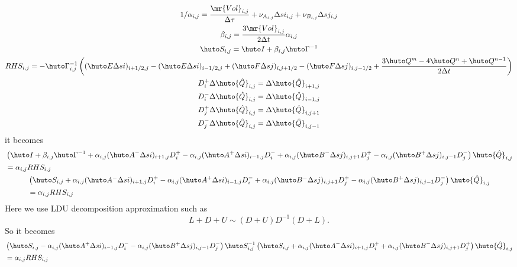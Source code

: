 \documentclass{jsarticle}
\newcommand{\bQ}{\huto Q}
\newcommand{\bhQ}{\huto{\hat Q}}
\newcommand{\bI}{\huto I}
\newcommand{\bE}{\huto E}
\newcommand{\bF}{\huto F}
\newcommand{\bA}{\huto A}
\newcommand{\bB}{\huto B}
\newcommand{\bS}{\huto S}
\newcommand{\bG}{\huto \Gamma}
\newcommand{\Vol}{\mr{Vol}}
\begin{document}
\begin{gather}
1/\alpha _{i,j}=\frac{\Vol _{i,j}}{\Delta \tau} + \nu _{A_{i,j}}\Delta si_{i,j} + \nu _{B_{i,j  }}\Delta sj_{i,j  }\\
\beta _{i,j} = \frac{3\Vol _{i,j}}{2\Delta t}\alpha_{i,j}\\
\bS_{i,j} = \bI +\beta _ {i,j}\bG ^{-1}\\
RHS_{i,j} = -\bG ^{-1} _{i,j} \left( (\bE \Delta si)_{i+1/2,j} - (\bE \Delta si)_{i-1/2,j}+  (\bF \Delta sj)_{i,j+1/2} - (\bF \Delta sj)_{i,j-1/2}+\frac{3\bQ^m-4\bQ^n+\bQ^{n-1}}{2\Delta t}\right) \\
D_i^+ \Delta \bhQ_{i,j} = \Delta \bhQ_{i+1,j}\\
D_i^- \Delta \bhQ_{i,j} = \Delta \bhQ_{i-1,j}\\
D_j^+ \Delta \bhQ_{i,j} = \Delta \bhQ_{i,j+1}\\
D_j^- \Delta \bhQ_{i,j} = \Delta \bhQ_{i,j-1}
\end{gather}
it becomes
\begin{gather}
\begin{split}
&\left( \bI +\beta _ {i,j}\bG ^{-1}+ \alpha_{i,j}(\bA^-\Delta si)_{i+1,j}D_i^+ - \alpha_{i,j}(\bA^+\Delta si)_{i-1,j}D_i^-+ \alpha_{i,j}(\bB^-\Delta sj)_{i,j+1}D_j^+ - \alpha_{i,j}(\bB^+\Delta sj)_{i,j-1}D_j^- \right) \bhQ _{i,j}\\
&=\alpha_{i,j}RHS_{i,j}
\end{split}\\
\begin{split}
&\left( \bS_ {i,j}+ \alpha_{i,j}(\bA^-\Delta si)_{i+1,j}D_i^+ - \alpha_{i,j}(\bA^+\Delta si)_{i-1,j}D_i^-+ \alpha_{i,j}(\bB^-\Delta sj)_{i,j+1}D_j^+ - \alpha_{i,j}(\bB^+\Delta sj)_{i,j-1}D_j^- \right) \bhQ _{i,j}\\
&=\alpha_{i,j}RHS_{i,j}
\end{split}
\end{gather}
Here we use LDU decomposition approximation such as
\begin{equation}
L+D+U \sim (D+U)D^{-1}(D+L).
\end{equation}
So it becomes
\begin{gather}
\begin{split}
&\left( \bS_{i,j} -\alpha_{i,j}(\bA^+\Delta si)_{i-1,j}D_i^- -\alpha_{i,j}(\bB^+\Delta sj)_{i,j-1}D_j^-\right)\bS_{i,j}^{-1}\left( \bS_{i,j} +\alpha_{i,j}(\bA^-\Delta si)_{i+1,j}D_i^+ +\alpha_{i,j} (\bB^-\Delta sj)_{i,j+1}D_j^+\right) \bhQ _{i,j}\\
&=\alpha_{i,j}RHS_{i,j}
\end{split}
\end{gather}
\end{document}
